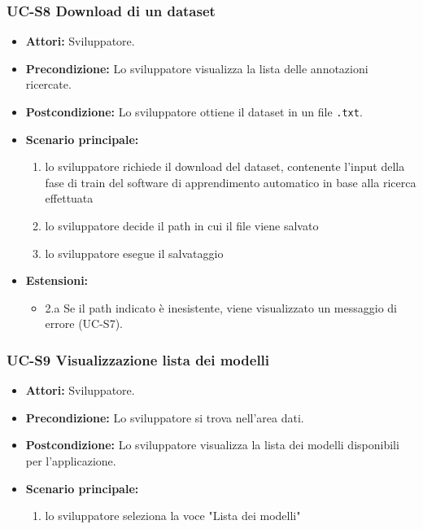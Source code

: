 	\subsubsection{UC-S8 Download di un dataset}
		\begin{itemize}
			\item \textbf{Attori:} Sviluppatore.
			\item \textbf{Precondizione:} Lo sviluppatore visualizza la lista delle annotazioni ricercate.
			\item \textbf{Postcondizione:} Lo sviluppatore ottiene il dataset in un file \texttt{.txt}.
			\item \textbf{Scenario principale:}
			\begin{enumerate}
				\item lo sviluppatore richiede il download del dataset, contenente l'input della fase di train del software di apprendimento automatico in base alla ricerca effettuata
				\item lo sviluppatore decide il path in cui il file viene salvato
				\item lo sviluppatore esegue il salvataggio
			\end{enumerate}
			\item \textbf{Estensioni:}
				\begin{itemize}
					\item 2.a Se il path indicato è inesistente, viene visualizzato un messaggio di errore (UC-S7).
				\end{itemize}
		\end{itemize}
		
	\subsubsection{UC-S9 Visualizzazione lista dei modelli}
		\begin{itemize}
			\item \textbf{Attori:} Sviluppatore.
			\item \textbf{Precondizione:} Lo sviluppatore si trova nell'area dati.
			\item \textbf{Postcondizione:} Lo sviluppatore visualizza la lista dei modelli disponibili per l'applicazione.
			\item \textbf{Scenario principale:}
			\begin{enumerate}
					\item lo sviluppatore seleziona la voce "Lista dei modelli"
				\end{enumerate}
		\end{itemize}	
	
